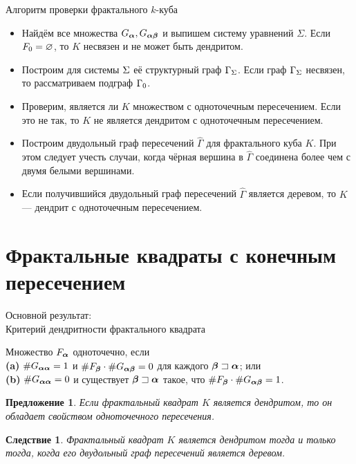 \documentclass[aspectratio=1610, 10pt, notheorems]{beamer}
\newtheorem{proposition} {Предложение}
\newtheorem{corollary}   {Следствие}
\begin{document}
\begin{frame}{Алгоритм проверки фрактального $k$-куба}


\begin{itemize}

\item  Найдём все множества $G_{\bm{\alpha}}, G_{{\bm{\alpha}}{\bm{\beta}}}$ и выпишем систему уравнений $\Sigma$.
Если $F_0=\varnothing$, то $K$ несвязен и не может быть дендритом.

\item  Построим для системы $\Sigma$ её структурный граф $\Gamma_\Sigma$.
Если граф $\Gamma_\Sigma$ несвязен, то рассматриваем подграф $\Gamma_0$.
 
\item  Проверим, является ли $K$ множеством с одноточечным пересечением.
Если это не так, то $K$ не является дендритом с одноточечным пересечением.
    
\item  Построим двудольный граф пересечений $\hat\Gamma$ для фрактального куба $K$.
При этом следует учесть случаи, когда чёрная вершина в $\hat\Gamma$ соединена более чем с двумя белыми вершинами.

\item  Если получившийся двудольный граф пересечений $\hat\Gamma$ является деревом, то $K$ --- дендрит с одноточечным пересечением.    
\end{itemize}
\end{frame}


\section{Фрактальные квадраты с конечным пересечением}


\begin{frame}{Основной результат:\\Критерий дендритности фрактального квадрата}

Множество $F_{\bm{\alpha}}$ одноточечно, если \\
\textbf{(a)} $\#G_{{\bm{\alpha}}{\bm{\alpha}}}=1$ и $\#F_{\bm{\beta}}\cdot\#G_{{\bm{\alpha}}{\bm{\beta}}}=0$ для каждого ${\bm{\beta}}\sqsupset{\bm{\alpha}}$; или\\
\textbf{(b)} $\#G_{{\bm{\alpha}}{\bm{\alpha}}}=0$ и существует ${\bm{\beta}}\sqsupset{\bm{\alpha}}$ такое, что $\#F_{\bm{\beta}}\cdot\#G_{{\bm{\alpha}}{\bm{\beta}}}=1$.

\begin{proposition}
Если фрактальный квадрат $K$ является дендритом, то он обладает свойством одноточечного пересечения.
\end{proposition}
\begin{corollary}
Фрактальный квадрат $K$ является дендритом тогда и только тогда, когда его двудольный граф пересечений является деревом.
\end{corollary}
\end{frame}
\end{document}

